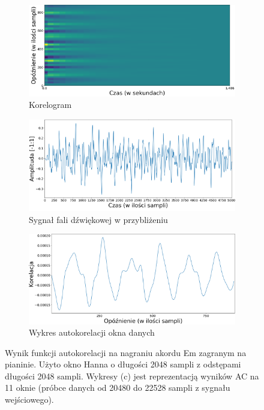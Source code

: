 \documentclass[12pt,a4paper,twoside]{mwart}
\begin{document}
\begin{figure}[ht]
  \begin{subfigure}{1.\textwidth}
    \centering
    \includegraphics[width=.49\linewidth]{images/Em/Corelogram_cropped.png}
    \caption{Korelogram}
  \end{subfigure}
  \newline
  \begin{subfigure}{0.5\textwidth}
    \includegraphics[width=1.\linewidth]{images/Em/waveform_zoom_samples_cropped.png}
    \caption{Sygnał fali dźwiękowej w przybliżeniu}
  \end{subfigure}
  \begin{subfigure}{0.49\textwidth}
    \includegraphics[width=1.\linewidth]{images/Em/corelation_cropped.png}
    \caption{Wykres autokorelacji okna danych}
  \end{subfigure}
  \caption{Wynik funkcji autokorelacji na nagraniu akordu Em zagranym na pianinie. Użyto okno Hanna o długości 2048 sampli z odstępami długości 2048 sampli. Wykresy (c) jest reprezentacją wyników AC na 11 oknie (próbce danych od 20480 do 22528 sampli z sygnału wejściowego).}
  \label{fig:multi:ac:em}
\end{figure}
\end{document}
